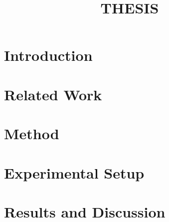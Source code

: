 \documentclass[11pt,a4paper]{article}
\begin{document}
\title{{{THESIS}}}
\author{}   %
\date{}
\maketitle

\begin{abstract}

\end{abstract}

\section{Introduction}


\section{Related Work}


% 

\section{Method}


\section{Experimental Setup}


\section{Results and Discussion}

\end{document}
